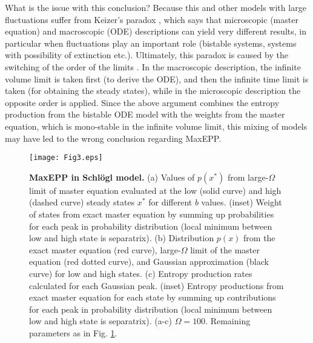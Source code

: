 \documentclass[aps,prl,reprint,singlecolumn,superscriptaddress]{revtex4}
\begin{document}
{What is the issue with this conclusion? Because this and other models with large fluctuations suffer from 
Keizer’s paradox \cite{kurtz71,kurtz72,vellela07}, which says that microscopic (master equation) and macroscopic (ODE) descriptions can yield 
very different results, in particular when fluctuations play an important role (bistable systems, systems with 
possibility of extinction etc.). Ultimately, this paradox is caused by the switching of the order of the limits \cite{vellela09}. 
In the macroscopic description, the infinite volume limit is taken first (to derive the ODE), and 
then the infinite time limit is taken (for obtaining the steady states), while in the microscopic description 
the opposite order is applied. {Since the above argument combines the entropy production from the
bistable ODE model with the weights from the master equation, which is mono-stable in the infinite volume limit, 
this mixing of models may have led to the wrong conclusion regarding MaxEPP.}\\

\begin{figure}[t]
\texttt{[image: Fig3.eps]}
\caption{{\bf MaxEPP in Schl\"ogl model.}
(a) Values of $p(x^*)$ from large-$\Omega$ limit of master equation evaluated at the low (solid curve)
and high (dashed curve) steady states $x^*$ for different $b$ values. 
{(inset) Weight of states from exact master equation by summing up probabilities for each peak in probability 
distribution (local minimum between low and high state is separatrix).}
(b) Distribution $p(x)$ from the exact master equation (red curve), large-$\Omega$ limit of the master 
equation (red dotted curve), and Gaussian approximation (black curve) for low and high states. 
(c) Entropy production rates calculated for each Gaussian peak. {(inset) Entropy productions from exact master
equation for each state by summing up contributions for each peak in probability distribution (local minimum between low 
and high state is separatrix).} (a-c) $\Omega=100$. Remaining parameters as in Fig. \ref{fig3}.}
\label{fig3}
\end{figure}

}
\end{document}
